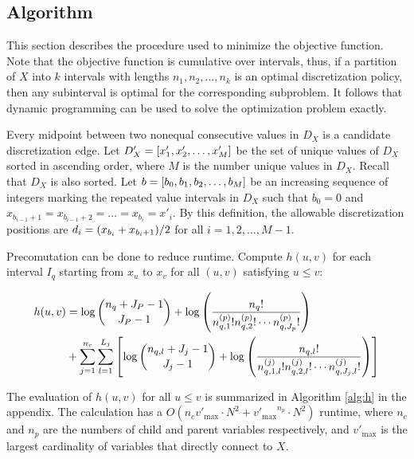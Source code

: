 \subsection{Algorithm}

This section describes the procedure used to minimize the objective function.
Note that the objective function is cumulative over intervals, thus, if a partition of $X$ into $k$ intervals with lengths $n_1,n_2,\ldots,n_k$ is an optimal discretization policy, then any subinterval is optimal for the corresponding subproblem.
It follows that dynamic programming can be used to solve the optimization problem exactly.

Every midpoint between two nonequal consecutive values in $D_X$ is a candidate discretization edge.
Let ${D'_X} = \brock{x'_1,x'_2,\ldots,x'_M}$ be the set of unique values of $D_X$ sorted in ascending order, where $M$ is the number unique values in $D_X$.
Recall that $D_X$ is also sorted.
Let $b = \brock{b_0,b_1,b_2,\ldots,b_M}$ be an increasing sequence of integers marking the repeated value intervals in $D_X$ such that $b_0 = 0$ and $x_{b_{i-1} + 1} = x_{b_{i-1} + 2} = \ldots = x_{b_i} = x'_i$.
By this definition, the allowable discretization positions are $d_i = \paren{x_{b_{i}} + x_{{b_i}+1}}/2$ for all $i = 1,2,\ldots,M-1$.

Precomutation can be done to reduce runtime.
Compute $h(u,v)$ for each interval $I_q$ starting from $x_{u}$ to $x_{v}$ for all $(u,v)$ satisfying $u \leq v$:

\begin{small}
\begin{equation}
\begin{aligned}
h(u,v) &=  \log {{n_{q} + J_P - 1}\choose{J_P-1}} + \log \left( { {{n_q}!}\over{ {n^{(p)}_{q,1} !} {n^{(p)}_{q,2} !} \cdots {n^{(p)}_{q,J_p} !}} } \right) \\
& + \sum_{j=1}^{n_c} \sum_{l=1}^{L_j} \left[  \log{{n_{q,l} + J_j - 1}\choose{J_j-1}} + \log \left( { {{n_{q,l}}!}\over{ {n^{(j)}_{q,1,l} !} {n^{(j)}_{q,2,l} !} \cdots {n^{(j)}_{q,J_j,l} !}} } \right) \right]
\end{aligned}
\end{equation}
\end{small}

The evaluation of $h(u,v)$ for all $u \leq v$ is summarized in Algorithm \ref{alg:h} in the appendix.
The calculation has a $O(n_c  {v'_\text{max}} \cdot N^2 + {v'_\text{max}}^{n_p} \cdot N^2)$ runtime, where $n_c$ and $n_p$ are the numbers of child and parent variables respectively, and $v'_\text{max}$ is the largest cardinality of variables that directly connect to $X$.

